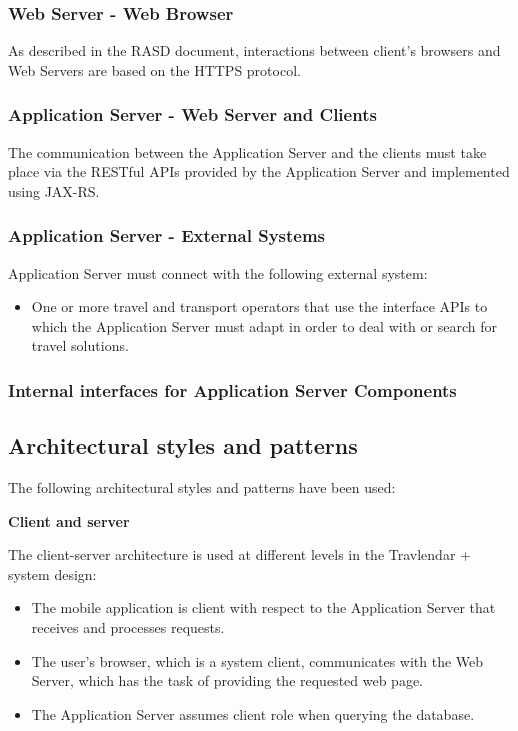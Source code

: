 \documentclass{article}
\begin{document}
	\subsubsection{Web Server - Web Browser}
	As described in the RASD document, interactions between client’s  browsers and Web Servers are based on the HTTPS protocol.


	\subsubsection{Application Server - Web Server and Clients}
	The communication between the Application Server and the clients must take place via the RESTful APIs provided by the Application Server and implemented using JAX-RS.


	\subsubsection{Application Server - External Systems}
	Application Server must connect with the following external system:
	\begin{itemize}
	\item One or more travel and transport operators that use the interface APIs to which the Application Server must adapt in order to deal with or search for travel solutions.
	\end{itemize}


	\subsubsection{Internal interfaces for Application Server Components}


	\subsection{Architectural styles and patterns}
	The following architectural styles and patterns have been used:
	
	\bigskip
	\noindent
	\textbf{Client and server}
	
	\bigskip
	\noindent
	The client-server architecture is used at different levels in the Travlendar + system design:
	\begin{itemize}
	\item The mobile application is client with respect to the Application Server that receives and processes requests.
	\item The user’s browser, which is a system client, communicates with the Web Server, which has the task of providing the requested web page.
	\item The Application Server assumes client  role when querying the database.
	\end{itemize}	
\end{document}
